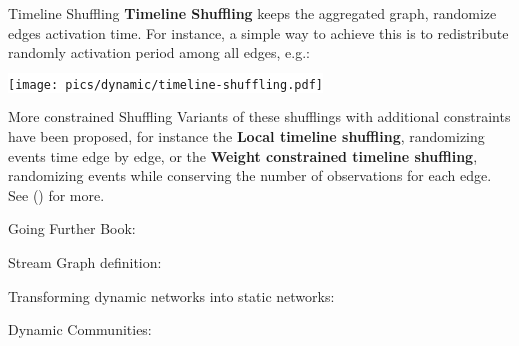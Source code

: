 \begin{textbox}{Timeline Shuffling}
    \textbf{Timeline Shuffling} keeps the aggregated graph, randomize edges activation time. For instance, a simple way to achieve this is to redistribute randomly activation period among all edges, e.g.:


    \centering

    \colorbox{white}{\texttt{[image: pics/dynamic/timeline-shuffling.pdf]}}
\end{textbox}


\begin{textbox}{More constrained Shuffling}
    Variants of these shufflings with additional constraints have been proposed, for instance the \textbf{Local timeline shuffling}, randomizing events time edge by edge, or the \textbf{Weight constrained timeline shuffling}, randomizing events while conserving the number of observations for each edge. See (\cite{gauvin2022}) for more.

    \centering

\end{textbox}


\begin{textbox}{Going Further}
    Book: \cite{holme2019temporal}

    Stream Graph definition: \cite{latapy2018stream}

    Transforming dynamic networks into static networks:  \cite{kivela2018mapping}

    Dynamic Communities: \cite{rossetti2018community}
\end{textbox}